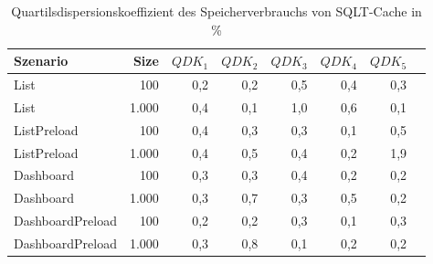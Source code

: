 
\begin{table}[ht]
\setlength{\extrarowheight}{-1pt}
\centering
\caption{Quartilsdispersionskoeffizient des Speicherverbrauchs von SQLT-Cache in \%}
\begin{tabular}{lrrrrrrr}
\toprule
Szenario & Size & ${QDK_1}$ & ${QDK_2}$ & ${QDK_3}$& ${QDK_4}$ & ${QDK_5}$ \\
\midrule
	List & 100 & \cellcolor{red!1}  0,2 & \cellcolor{red!1}  0,2 & \cellcolor{red!1}  0,5 & \cellcolor{red!1}  0,4 & \cellcolor{red!1}  0,3 \\
	List & 1.000 & \cellcolor{red!1}  0,4 & \cellcolor{red!1}  0,1 & \cellcolor{red!2}  1,0 & \cellcolor{red!1}  0,6 & \cellcolor{red!1}  0,1 \\
	ListPreload & 100 & \cellcolor{red!1}  0,4 & \cellcolor{red!1}  0,3 & \cellcolor{red!1}  0,3 & \cellcolor{red!1}  0,1 & \cellcolor{red!1}  0,5 \\
	ListPreload & 1.000 & \cellcolor{red!1}  0,4 & \cellcolor{red!1}  0,5 & \cellcolor{red!1}  0,4 & \cellcolor{red!1}  0,2 & \cellcolor{red!2}  1,9 \\
	Dashboard & 100 & \cellcolor{red!1}  0,3 & \cellcolor{red!1}  0,3 & \cellcolor{red!1}  0,4 & \cellcolor{red!1}  0,2 & \cellcolor{red!1}  0,2 \\
	Dashboard & 1.000 & \cellcolor{red!1}  0,3 & \cellcolor{red!1}  0,7 & \cellcolor{red!1}  0,3 & \cellcolor{red!1}  0,5 & \cellcolor{red!1}  0,2 \\
	DashboardPreload & 100 & \cellcolor{red!1}  0,2 & \cellcolor{red!1}  0,2 & \cellcolor{red!1}  0,3 & \cellcolor{red!1}  0,1 & \cellcolor{red!1}  0,3 \\
	DashboardPreload & 1.000 & \cellcolor{red!1}  0,3 & \cellcolor{red!1}  0,8 & \cellcolor{red!1}  0,1 & \cellcolor{red!1}  0,2 & \cellcolor{red!1}  0,2 \\
\bottomrule
\end{tabular}
\label{tab:quartilsdispersionskoeffizient_speicherverbrauch_sqltcache}
\end{table}
	